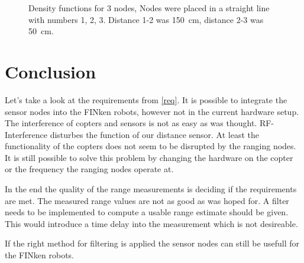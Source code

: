 \begin{figure}[H]
	\centering
	
	\caption[Density functions for 3 nodes]{Density functions for 3 nodes, Nodes were placed in a straight line with numbers 1, 2, 3. Distance 1-2 was \SI{150}{cm}, distance 2-3 was \SI{50}{cm}. }
	\label{triangle}
\end{figure}


\section{Conclusion}

Let's take a look at the requirements from \autoref{req}.
It is possible to integrate the sensor nodes into the FINken robots, however not in the current hardware setup.
The interference of copters and sensors is not as easy as was thought.
RF-Interference disturbes the function of our distance sensor.
At least the functionality of the copters does not seem to be disrupted by the ranging nodes.
It is still possible to solve this problem by changing the hardware on the copter or the frequency the ranging nodes operate at.

In the end the quality of the range measurements is deciding if the requirements are met.
The measured range values are not as good as was hoped for.
A filter needs to be implemented to compute a usable range estimate should be given.
This would introduce a time delay into the measurement which is not desireable. 

If the right method for filtering is applied the sensor nodes can still be usefull for the FINken robots.
